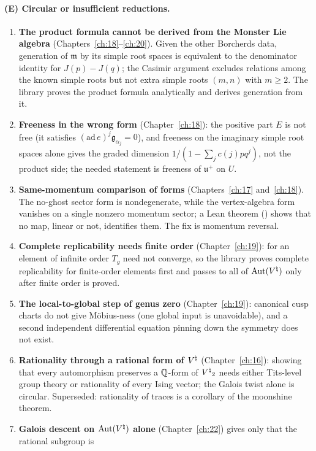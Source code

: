 \paragraph{(E) Circular or insufficient reductions.}
\begin{enumerate}
\item \textbf{The product formula cannot be derived from the Monster Lie algebra} (Chapters~\ref{ch:18}--\ref{ch:20}).
  Given the other Borcherds data, generation of $\mathfrak m$ by its simple root spaces is equivalent to the
  denominator identity for $J(p)-J(q)$; the Casimir argument excludes relations among the known simple roots but not
  extra simple roots $(m,n)$ with $m\ge2$. The library proves the product formula analytically and derives generation
  from it.
\item \textbf{Freeness in the wrong form} (Chapter~\ref{ch:18}): the positive part $E$ is not free (it satisfies
  $(\mathrm{ad}\,e)^j\mathfrak g_{\alpha_j}=0$), and freeness on the imaginary simple root spaces alone gives the graded
  dimension $1/(1-\sum_jc(j)pq^j)$, not the product side; the needed statement is freeness of $\mathfrak u^+$ on $U$.
\item \textbf{Same-momentum comparison of forms} (Chapters~\ref{ch:17} and~\ref{ch:18}). The no-ghost sector form is
  nondegenerate, while the vertex-algebra form vanishes on a single nonzero momentum sector; a Lean theorem
  () shows that no map, linear or not, identifies them. The fix is
  momentum reversal.
\item \textbf{Complete replicability needs finite order} (Chapter~\ref{ch:19}): for an element of infinite order $T_g$
  need not converge, so the library proves complete replicability for finite-order elements first and passes to all of
  $\operatorname{Aut}({V^{\natural}})$ only after finite order is proved.
\item \textbf{The local-to-global step of genus zero} (Chapter~\ref{ch:19}): canonical cusp charts do not give
  M\"obius-ness (one global input is unavoidable), and a second independent differential equation pinning down the
  symmetry does not exist.
\item \textbf{Rationality through a rational form of ${V^{\natural}}$} (Chapter~\ref{ch:16}): showing that every automorphism
  preserves a ${\mathbb{Q}}$-form of ${V^{\natural}}_2$ needs either Tits-level group theory or rationality of every Ising vector; the Galois
  twist alone is circular. Superseded: rationality of traces is a corollary of the moonshine theorem.
\item \textbf{Galois descent on $\operatorname{Aut}({V^{\natural}})$ alone} (Chapter~\ref{ch:22}) gives only that the rational subgroup is

\end{enumerate}
